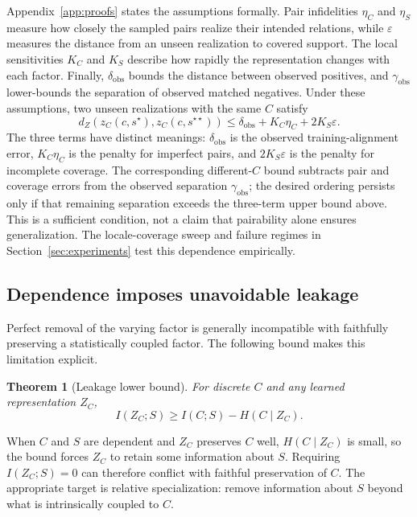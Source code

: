 \documentclass[11pt]{article}
\newtheorem{theorem}{Theorem}
\newcommand{\zC}{z_C}
\newcommand{\dZ}{d_Z}
\begin{document}
Appendix~\ref{app:proofs} states the assumptions formally. Pair infidelities $\eta_C$ and $\eta_S$ measure how closely the sampled pairs realize their intended relations, while $\varepsilon$ measures the distance from an unseen realization to covered support. The local sensitivities $K_C$ and $K_S$ describe how rapidly the representation changes with each factor. Finally, $\delta_{\mathrm{obs}}$ bounds the distance between observed positives, and $\gamma_{\mathrm{obs}}$ lower-bounds the separation of observed matched negatives. Under these assumptions, two unseen realizations with the same $C$ satisfy
\begin{equation}
\dZ(\zC(c,s^\star),\zC(c,s^{\star\star}))
\leq\delta_{\mathrm{obs}}+K_C\eta_C+2K_S\varepsilon.
\end{equation}
The three terms have distinct meanings: $\delta_{\mathrm{obs}}$ is the observed training-alignment error, $K_C\eta_C$ is the penalty for imperfect pairs, and $2K_S\varepsilon$ is the penalty for incomplete coverage. The corresponding different-$C$ bound subtracts pair and coverage errors from the observed separation $\gamma_{\mathrm{obs}}$; the desired ordering persists only if that remaining separation exceeds the three-term upper bound above. This is a sufficient condition, not a claim that pairability alone ensures generalization. The locale-coverage sweep and failure regimes in Section~\ref{sec:experiments} test this dependence empirically.

\subsection{Dependence imposes unavoidable leakage}
Perfect removal of the varying factor is generally incompatible with faithfully preserving a statistically coupled factor. The following bound makes this limitation explicit.
\begin{theorem}[Leakage lower bound]\label{thm:leakage}
For discrete $C$ and any learned representation $Z_C$,
\begin{equation}
I(Z_C;S)\geq I(C;S)-H(C\mid Z_C).
\end{equation}
\end{theorem}

When $C$ and $S$ are dependent and $Z_C$ preserves $C$ well, $H(C\mid Z_C)$ is small, so the bound forces $Z_C$ to retain some information about $S$. Requiring $I(Z_C;S)=0$ can therefore conflict with faithful preservation of $C$. The appropriate target is relative specialization: remove information about $S$ beyond what is intrinsically coupled to $C$.
\end{document}
